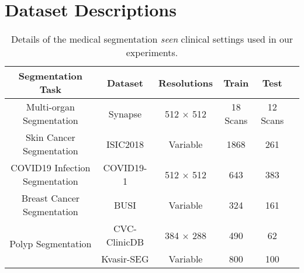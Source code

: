 \clearpage
\setcounter{page}{1}
\maketitlesupplementary

\section{Dataset Descriptions}
\label{appendix_dataset_descriptions}

\begin{table}[h]
    \centering
    \scriptsize
    \setlength\tabcolsep{2pt} %
    \begin{tabular}{c|c|cccc}
    \hline
    Segmentation Task &  Dataset & Resolutions       & Train & Test \\
    \hline
    Multi-organ Segmentation      & Synapse   & 512 $\times$ 512        & 18 Scans & 12 Scans \\ 
    \hline
    Skin Cancer Segmentation      & ISIC2018   & Variable          & 1868     & 261 \\ 
    \hline
    COVID19 Infection Segmentation & COVID19-1   & 512 $\times$ 512  & 643      & 383 \\
    \hline
    Breast Cancer Segmentation    & BUSI    & Variable          & 324      & 161 \\
    \hline
    \multicolumn{1}{c|}{\multirow{2}{*}{Polyp Segmentation}} & CVC-ClinicDB    & 384 $\times$ 288          & 490  & 62  \\
      & Kvasir-SEG & Variable           & 800 & 100 \\
    \hline
    \end{tabular}
    \caption{Details of the medical segmentation \textit{seen} clinical settings used in our experiments.}
    \label{tab:seen_clinical_dataset}
\end{table}

